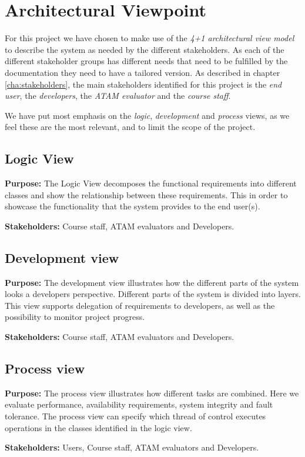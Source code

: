 \chapter{Architectural Viewpoint}
\label{cha:architectural_viewpoint}
For this project we have chosen to make use of the \emph{4+1 architectural view model} to describe the system as needed by the different stakeholders. As each of the different stakeholder groups has different needs that need to be fulfilled by the documentation they need to have a tailored version. As described in chapter \ref{cha:stakeholders}, the main stakeholders identified for this project is the \emph{end user}, the \emph{developers}, the \emph{ATAM evaluator} and the \emph{course staff}.


We have put most emphasis on the \emph{logic}, \emph{development} and \emph{process} views, as we feel these are the most relevant, and to limit the scope of the project.


    \section{Logic View}
    \textbf{Purpose:} The Logic View decomposes the functional requirements into different classes and show the relationship between these requirements. This in order to showcase the functionality that the system provides to the end user(s).    
    
    \noindent\textbf{Stakeholders:} Course staff, ATAM evaluators and Developers.
    


    \section{Development view}
    \textbf{Purpose:} The development view illustrates how the different parts of the system looks a developers perspective. Different parts of the system is divided into layers. This view supports delegation of requirements to developers, as well as the possibility to monitor project progress.
    
    \noindent\textbf{Stakeholders:} Course staff, ATAM evaluators and Developers.
    
    

    \section{Process view}
    \noindent\textbf{Purpose:} The process view illustrates how different tasks are combined. Here we evaluate performance, availability requirements, system integrity and fault tolerance.
    The process view can specify which thread of control executes operations in the classes identified in the logic view. 

    \noindent\textbf{Stakeholders:} Users, Course staff, ATAM evaluators and Developers.
    

